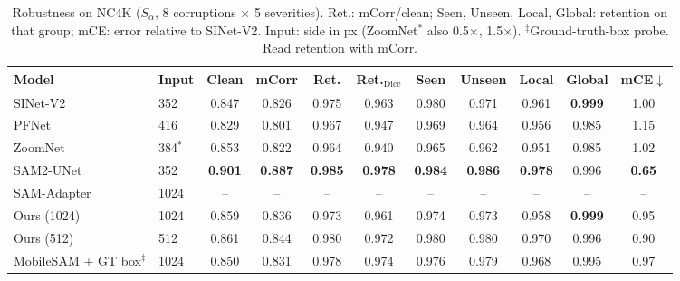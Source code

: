 \begin{table}[t]
\centering
\caption{Robustness on NC4K ($S_\alpha$, 8 corruptions $\times$ 5 severities). Ret.: mCorr/clean; Seen, Unseen, Local, Global: retention on that group; mCE: error relative to SINet-V2. Input: side in px (ZoomNet$^*$ also 0.5$\times$, 1.5$\times$). $^\ddagger$Ground-truth-box probe. Read retention with mCorr.}
\label{tab:robust-nc4k}
\footnotesize
\setlength{\tabcolsep}{4pt}
\begin{tabular}{llccccccccc}
\toprule
Model & Input & Clean & mCorr & Ret. & Ret.$_{\mathrm{Dice}}$ & Seen & Unseen & Local & Global & mCE$\downarrow$ \\
\midrule
SINet-V2 & 352 & 0.847 & 0.826 & 0.975 & 0.963 & 0.980 & 0.971 & 0.961 & \textbf{0.999} & 1.00 \\
PFNet & 416 & 0.829 & 0.801 & 0.967 & 0.947 & 0.969 & 0.964 & 0.956 & 0.985 & 1.15 \\
ZoomNet & 384$^*$ & 0.853 & 0.822 & 0.964 & 0.940 & 0.965 & 0.962 & 0.951 & 0.985 & 1.02 \\
\midrule
SAM2-UNet & 352 & \textbf{0.901} & \textbf{0.887} & \textbf{0.985} & \textbf{0.978} & \textbf{0.984} & \textbf{0.986} & \textbf{0.978} & 0.996 & \textbf{0.65} \\
SAM-Adapter & 1024 & -- & -- & -- & -- & -- & -- & -- & -- & -- \\
\midrule
Ours (1024) & 1024 & 0.859 & 0.836 & 0.973 & 0.961 & 0.974 & 0.973 & 0.958 & \textbf{0.999} & 0.95 \\
Ours (512) & 512 & 0.861 & 0.844 & 0.980 & 0.972 & 0.980 & 0.980 & 0.970 & 0.996 & 0.90 \\
\midrule
MobileSAM + GT box$^\ddagger$ & 1024 & 0.850 & 0.831 & 0.978 & 0.974 & 0.976 & 0.979 & 0.968 & 0.995 & 0.97 \\
\bottomrule
\end{tabular}
\end{table}
